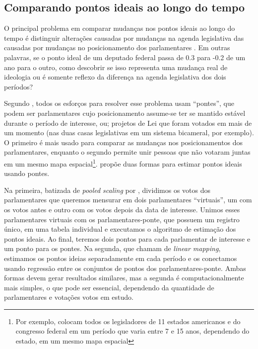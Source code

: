 \documentclass[a4paper,titlepage]{ppgi}\usepackage[]{graphicx}\usepackage[]{color}
\begin{document}


\subsection{Comparando pontos ideais ao longo do tempo}
\label{cap:fundamentacao:comparando-pontos-ideais-no-tempo}

O principal problema em comparar mudanças nos pontos ideais ao longo do tempo é
distinguir alterações causadas por mudanças na agenda legislativa das causadas
por mudanças no posicionamento dos parlamentares \cite{Bailey2007}. Em outras
palavras, se o ponto ideal de um deputado federal passa de 0.3 para -0.2 de um ano
para o outro, como descobrir se isso representa uma mudança real de ideologia ou
é somente reflexo da diferença na agenda legislativa dos dois períodos?

Segundo , todos os esforços para resolver esse problema
usam ``pontes'', que podem ser parlamentares cujo posicionamento assume-se ter
se mantido estável durante o período de interesse, ou; projetos de Lei que
foram votados em mais de um momento (nas duas casas legislativas em um sistema
bicameral, por exemplo). O primeiro é mais usado para comparar as mudanças nos
posicionamentos dos parlamentares, enquanto o segundo permite unir pessoas que
não votaram juntas em um mesmo mapa espacial\footnote{Por exemplo,
 colocam todos os legisladores de 11 estados americanos e
do congresso federal em um período que varia entre 7 e 15 anos, dependendo do
estado, em um mesmo mapa espacial}.  propõe duas formas
para estimar pontos ideais usando pontes.

Na primeira, batizada de \emph{pooled scaling} por ,
dividimos os votos dos parlamentares que queremos mensurar em dois
parlamentares ``virtuais'', um com os votos antes e outro com os votos depois
da data de interesse. Unimos esses parlamentares virtuais com os
parlamentares-ponte, que possuem um registro único, em uma tabela individual e
executamos o algoritmo de estimação dos pontos ideais. Ao final, teremos dois
pontos para cada parlamentar de interesse e um ponto para os pontes. Na
segunda, que  chamam de \emph{linear mapping}, estimamos
os pontos ideias separadamente em cada período e os conectamos usando regressão
entre os conjuntos de pontos dos parlamentares-ponte. Ambas formas devem gerar
resultados similares, mas a segunda é computacionalmente mais simples, o que
pode ser essencial, dependendo da quantidade de parlamentares e votações votos
em estudo.
\end{document}
